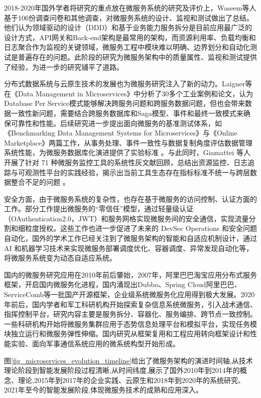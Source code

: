 2018-2020年国外学者将研究的重点放在微服务系统的研究及评价上，Waseem\cite{Waseem2021Design}等人基于106份调查问卷和其他调查，对微服务系统的设计、监视和测试做出了总结。他们认为领域驱动的设计（DDD）和基于业务能力服务拆分是目前应用最广泛的设计方式，API网关和Back-end架构是最常用的架构，而资源利用率、负载均衡和日志聚合作为监视的关键领域，微服务工程中模块难以明确、边界划分和自动化测试是普遍存在的问题。此阶段的研究为微服务架构中的质量属性、监视和测试提供了经验，为进一步的研究铺平了道路。

分布式数据系统与云原生技术的发展也为微服务研究注入了新的动力。Laigner等在《Data Management in Microservices》中分析了30多个工业案例和论文，认为Database Per Service模式能够解决跨服务问题和跨服务数据问题，但也会带来数据一致性新问题，需要结合跨服务数据库和Saga模型、事件和最终一致模式来确保可靠性和性能\cite{Laigner2021Data}。后续研究进一步提出面向微服务的基准测试体系，如《Benchmarking Data Management Systems for Microservices》与《Online Marketplace》两篇工作，从事务处理、事件一致性与数据复制角度评估数据管理系统性能，为微服务数据库化演进提供了实验标准 \cite{BenchmarkingDataMgmt2024,OnlineMarketplace2024}。与此同时，Giamattei 等人开展了针对 71 种微服务监控工具的系统性灰文献回顾，总结出资源监控、日志追踪与可观测性平台的实践经验，揭示出当前工具生态存在指标标准不统一与跨层数据整合不足的问题 \cite{MonitoringTools2023}。

安全方面，由于微服务系统的复杂性，也存在基于微服务的访问控制、认证方面的工作。部分工作提出微服务的“零信任”模型，通过轻量级认证（OAuthentication2.0，JWT）和服务网格实现微服务间的安全通信，实现流量分割和细粒度授权。这些工作也进一步促进了未来的 DevSec Operations 和安全问题自动化，国外的学术工作已经关注到了微服务架构的智能和自适应机制设计，通过 AI 和机器学习技术来实现微服务部署调度优化、容器调度、异常发现自动化等，将微服务系统变为动态自适应系统。

国内的微服务研究应用在2010年前后肇始，2007年，阿里巴巴淘宝应用分布式服务框架，开启国内微服务化进程，国内涌现出Dubbo、Spring Cloud阿里巴巴、ServiceComb等一批国产开源框架，企业级系统微服务化应用得到极大发展。2020年前后，国内学者和军工科研机构开始探索复杂信息系统微服务，引入战术通信、指挥控制平台，研究内容主要是服务拆分、容器化、服务编排、跨节点一致控制。一些科研机构开始将微服务集群应用于态势信息处理平台和模拟平台，实现任务模块独立运行和微服务弹性伸缩。国内研究从框架复用和工程应用转向框架设计和性能实验、面向军事通信系统应用的微系统构型开始形成。

图\ref{fig_microservices_evolution_timeline}给出了微服务架构的演进时间轴,从技术理论阶段到智能发展阶段过程清晰,从时间纬度,展示了国外2010年到2014年的概念、理论,2015年到2017年的企业实践、云原生和2018年到2020年的系统研究、2021年至今的智能发展阶段,体现微服务技术的成熟和应用深入。

